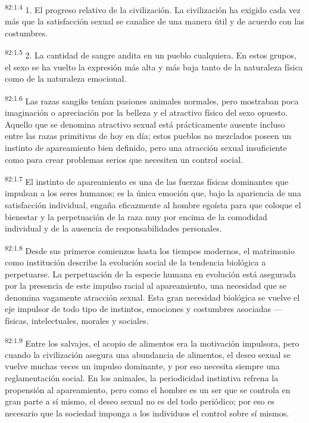 \documentclass[twoside, 11pt]{book}
\begin{document}
\par
\textsuperscript{82:1.4} 1. El progreso relativo de la civilización. La civilización ha exigido cada vez más que la satisfacción sexual se canalice de una manera útil y de acuerdo con las costumbres.

\par
\textsuperscript{82:1.5} 2. La cantidad de sangre andita en un pueblo cualquiera. En estos grupos, el sexo se ha vuelto la expresión más alta y más baja tanto de la naturaleza física como de la naturaleza emocional.

\par
\textsuperscript{82:1.6} Las razas sangiks tenían pasiones animales normales, pero mostraban poca imaginación o apreciación por la belleza y el atractivo físico del sexo opuesto. Aquello que se denomina atractivo sexual está prácticamente ausente incluso entre las razas primitivas de hoy en día; estos pueblos no mezclados poseen un instinto de apareamiento bien definido, pero una atracción sexual insuficiente como para crear problemas serios que necesiten un control social.

\par
\textsuperscript{82:1.7} El instinto de apareamiento es una de las fuerzas físicas dominantes que impulsan a los seres humanos; es la única emoción que, bajo la apariencia de una satisfacción individual, engaña eficazmente al hombre egoísta para que coloque el bienestar y la perpetuación de la raza muy por encima de la comodidad individual y de la ausencia de responsabilidades personales.

\par
\textsuperscript{82:1.8} Desde sus primeros comienzos hasta los tiempos modernos, el matrimonio como institución describe la evolución social de la tendencia biológica a perpetuarse. La perpetuación de la especie humana en evolución está asegurada por la presencia de este impulso racial al apareamiento, una necesidad que se denomina vagamente atracción sexual. Esta gran necesidad biológica se vuelve el eje impulsor de todo tipo de instintos, emociones y costumbres asociadas ---físicas, intelectuales, morales y sociales.

\par
\textsuperscript{82:1.9} Entre los salvajes, el acopio de alimentos era la motivación impulsora, pero cuando la civilización asegura una abundancia de alimentos, el deseo sexual se vuelve muchas veces un impulso dominante, y por eso necesita siempre una reglamentación social. En los animales, la periodicidad instintiva refrena la propensión al apareamiento, pero como el hombre es un ser que se controla en gran parte a sí mismo, el deseo sexual no es del todo periódico; por eso es necesario que la sociedad imponga a los individuos el control sobre sí mismos.
\end{document}
